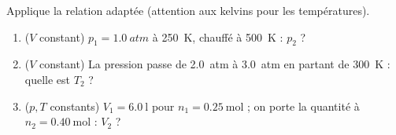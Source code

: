 \documentclass[11pt,a4paper]{article}
\begin{document}
\begin{exo}
Applique la relation adaptée (attention aux kelvins pour les températures).
\begin{enumerate}[label=\alph*)]
  \item ($V$ constant) $p_1=\qty{1.0}{atm}$ à \qty{250}{\kelvin}, chauffé à \qty{500}{\kelvin} : $p_2$ ?
  \item ($V$ constant) La pression passe de \qty{2.0}{atm} à \qty{3.0}{atm} en partant de
        \qty{300}{\kelvin} : quelle est $T_2$ ?
  \item ($p,T$ constants) $V_1=\qty{6.0}{\litre}$ pour $n_1=\qty{0.25}{\mole}$ ; on porte la quantité à
        $n_2=\qty{0.40}{\mole}$ : $V_2$ ?
\end{enumerate}
\end{exo}
\end{document}
